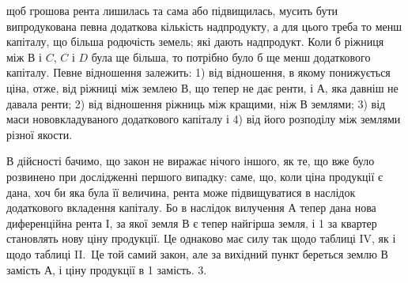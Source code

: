 \parcont{}  %
щоб грошова рента лишилась та сама або підвищилась, мусить бути випродукована
певна додаткова кількість надпродукту, а для цього треба то менш
капіталу, що більша родючість земель; які дають надпродукт. Коли б ріжниця
між $В$ і $C$, $C$ і $D$ була ще більша, то потрібно було б ще менш додаткового
капіталу. Певне відношення залежить: 1) від відношення, в якому понижується
ціна, отже, від ріжниці між землею $В$, що тепер не дає ренти, і $А$, яка давніш
не давала ренти; 2) від відношення ріжниць між кращими, ніж $В$ землями; 3) від
маси нововкладуваного додаткового капіталу і 4) від його розподілу між землями
різної якости.

В дійсності бачимо, що закон не виражає нічого іншого, як те, що вже
було розвинено при дослідженні першого випадку: саме, що, коли ціна продукції
є дана, хоч би яка була її величина, рента може підвищуватися в наслідок
додаткового вкладення капіталу. Бо в наслідок вилучення $А$ тепер дана нова диференційна
рента І, за якої земля $В$ є тепер найгірша земля, і 1 за
квартер становлять нову ціну продукції. Це однаково має силу так щодо таблиці
IV, як і щодо таблиці II.~Це той самий закон, але за вихідний
пункт береться землю $В$ замість $А$, і ціну продукції в 1 замість.
3.

